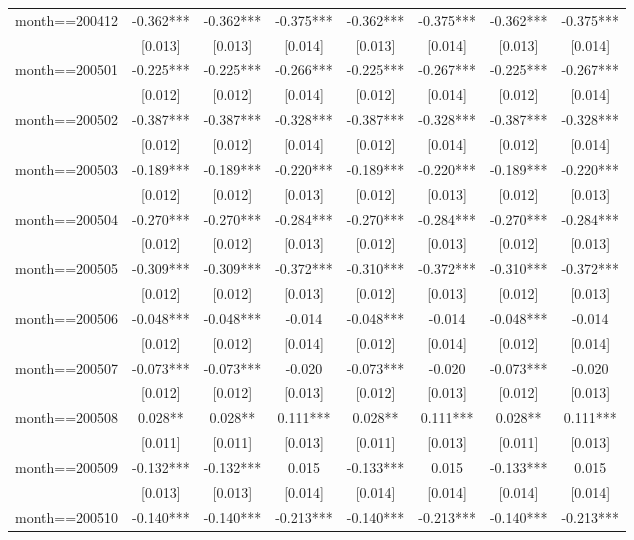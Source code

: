 \documentclass[]{article}
\begin{document}
\begin{tabular}{lccccccc}
month==200412 & -0.362*** & -0.362*** & -0.375*** & -0.362*** & -0.375*** & -0.362*** & -0.375*** \\
 & [0.013] & [0.013] & [0.014] & [0.013] & [0.014] & [0.013] & [0.014] \\
month==200501 & -0.225*** & -0.225*** & -0.266*** & -0.225*** & -0.267*** & -0.225*** & -0.267*** \\
 & [0.012] & [0.012] & [0.014] & [0.012] & [0.014] & [0.012] & [0.014] \\
month==200502 & -0.387*** & -0.387*** & -0.328*** & -0.387*** & -0.328*** & -0.387*** & -0.328*** \\
 & [0.012] & [0.012] & [0.014] & [0.012] & [0.014] & [0.012] & [0.014] \\
month==200503 & -0.189*** & -0.189*** & -0.220*** & -0.189*** & -0.220*** & -0.189*** & -0.220*** \\
 & [0.012] & [0.012] & [0.013] & [0.012] & [0.013] & [0.012] & [0.013] \\
month==200504 & -0.270*** & -0.270*** & -0.284*** & -0.270*** & -0.284*** & -0.270*** & -0.284*** \\
 & [0.012] & [0.012] & [0.013] & [0.012] & [0.013] & [0.012] & [0.013] \\
month==200505 & -0.309*** & -0.309*** & -0.372*** & -0.310*** & -0.372*** & -0.310*** & -0.372*** \\
 & [0.012] & [0.012] & [0.013] & [0.012] & [0.013] & [0.012] & [0.013] \\
month==200506 & -0.048*** & -0.048*** & -0.014 & -0.048*** & -0.014 & -0.048*** & -0.014 \\
 & [0.012] & [0.012] & [0.014] & [0.012] & [0.014] & [0.012] & [0.014] \\
month==200507 & -0.073*** & -0.073*** & -0.020 & -0.073*** & -0.020 & -0.073*** & -0.020 \\
 & [0.012] & [0.012] & [0.013] & [0.012] & [0.013] & [0.012] & [0.013] \\
month==200508 & 0.028** & 0.028** & 0.111*** & 0.028** & 0.111*** & 0.028** & 0.111*** \\
 & [0.011] & [0.011] & [0.013] & [0.011] & [0.013] & [0.011] & [0.013] \\
month==200509 & -0.132*** & -0.132*** & 0.015 & -0.133*** & 0.015 & -0.133*** & 0.015 \\
 & [0.013] & [0.013] & [0.014] & [0.014] & [0.014] & [0.014] & [0.014] \\
month==200510 & -0.140*** & -0.140*** & -0.213*** & -0.140*** & -0.213*** & -0.140*** & -0.213*** \\

\end{tabular}
\end{document}
